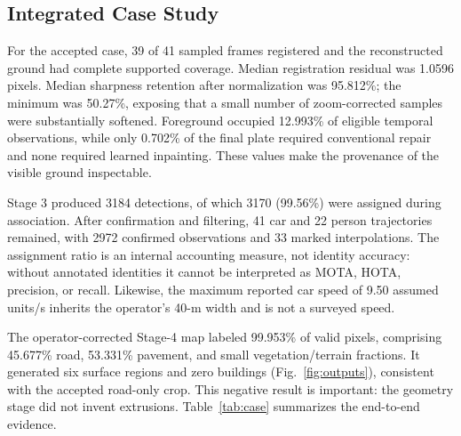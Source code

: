 \documentclass[letterpaper,conference]{IEEEtran}
\begin{document}
\begin{table}[t]
\caption{Stage-1 Outcomes from Four Distinct Video Runs}
\label{tab:clips}
\centering
\footnotesize
{}
\end{table}

\subsection{Integrated Case Study}
For the accepted case, 39 of 41 sampled frames registered and the reconstructed ground had complete supported coverage. Median registration residual was 1.0596 pixels. Median sharpness retention after normalization was 95.812\%; the minimum was 50.27\%, exposing that a small number of zoom-corrected samples were substantially softened. Foreground occupied 12.993\% of eligible temporal observations, while only 0.702\% of the final plate required conventional repair and none required learned inpainting. These values make the provenance of the visible ground inspectable.

Stage 3 produced 3184 detections, of which 3170 (99.56\%) were assigned during association. After confirmation and filtering, 41 car and 22 person trajectories remained, with 2972 confirmed observations and 33 marked interpolations. The assignment ratio is an internal accounting measure, not identity accuracy: without annotated identities it cannot be interpreted as MOTA, HOTA, precision, or recall. Likewise, the maximum reported car speed of 9.50 assumed units/s inherits the operator's 40-m width and is not a surveyed speed.

The operator-corrected Stage-4 map labeled 99.953\% of valid pixels, comprising 45.677\% road, 53.331\% pavement, and small vegetation/terrain fractions. It generated six surface regions and zero buildings (Fig.~\ref{fig:outputs}), consistent with the accepted road-only crop. This negative result is important: the geometry stage did not invent extrusions. Table~\ref{tab:case} summarizes the end-to-end evidence.
\end{document}
